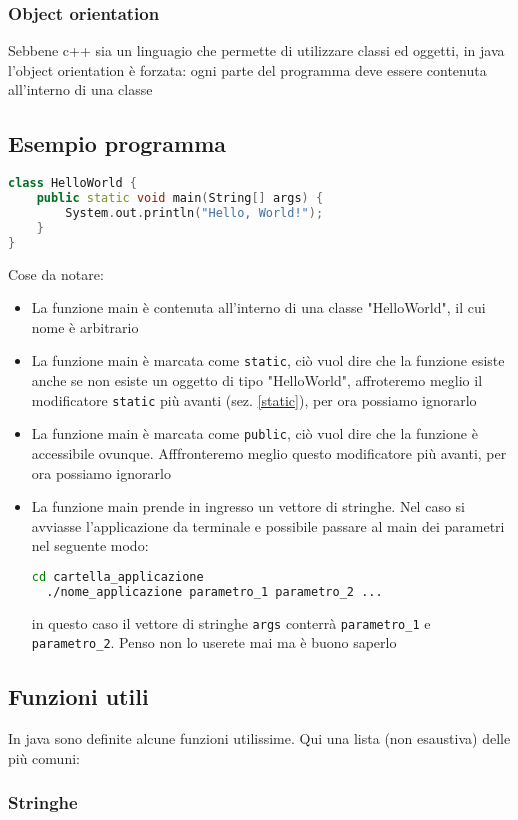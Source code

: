 \subsubsection{Object orientation}
Sebbene c++ sia un linguagio che permette di utilizzare classi ed oggetti, in java l'object orientation è forzata: ogni parte del programma deve essere contenuta all'interno di una classe

\subsection{Esempio programma}
\begin{lstlisting}[language = c++, frame = none]
class HelloWorld {
    public static void main(String[] args) {
        System.out.println("Hello, World!"); 
    }
}
\end{lstlisting}

Cose da notare:
\begin{itemize}
	\item La funzione main è contenuta all'interno di una classe "HelloWorld", il cui nome è arbitrario
	\item La funzione main è marcata come \verb|static|, ciò vuol dire che la funzione esiste anche se non esiste un oggetto di tipo "HelloWorld", affroteremo meglio il modificatore \verb|static| più avanti (sez. \ref{static}), per ora possiamo ignorarlo
	\item La funzione main è marcata come \verb|public|, ciò vuol dire che la funzione è accessibile ovunque. Afffronteremo meglio questo modificatore più avanti, per ora possiamo ignorarlo
	\item La funzione main prende in ingresso un vettore di stringhe. Nel caso si avviasse l'applicazione da terminale e possibile passare al main dei parametri nel seguente modo:
	      \begin{lstlisting}[language = bash, frame = none]
  cd cartella_applicazione 
  ./nome_applicazione parametro_1 parametro_2 ... \end{lstlisting}
	      in questo caso il vettore di stringhe \verb|args| conterrà \verb|parametro_1| e \verb|parametro_2|. Penso non lo userete mai ma è buono saperlo
\end{itemize}
\subsection{Funzioni utili}
In java sono definite alcune funzioni utilissime. Qui una lista (non esaustiva) delle più comuni:
\subsubsection{Stringhe}

